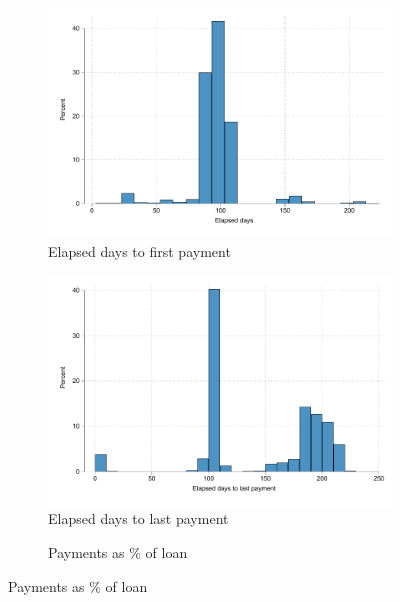 \vspace{.2in}
\begin{figure}[H]
    \caption{Behavior of those who lost pawn}
    \label{proxy_naive}
    \begin{center}
    \begin{subfigure}{0.40\textwidth}
        \caption{Elapsed days to first payment}
        \centering
        \includegraphics[width=\textwidth]{Figuras/hist_firstdays_default.pdf}
    \end{subfigure}
    \begin{subfigure}{0.40\textwidth}
        \caption{Elapsed days to last payment}
        \centering
        \includegraphics[width=\textwidth]{Figuras/hist_days_default.pdf}
    \end{subfigure}
        \begin{subfigure}{0.40\textwidth}
        \caption{Payments as \% of loan}

\end{subfigure}
\end{center}
\end{figure}
